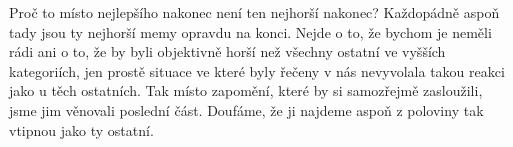 Proč to místo nejlepšího nakonec není ten nejhorší nakonec? Každopádně aspoň
tady jsou ty nejhorší memy opravdu na konci. Nejde o to, že bychom je neměli
rádi ani o to, že by byli objektivně horší než všechny ostatní ve vyšších
kategoriích, jen prostě situace ve které byly řečeny v nás nevyvolala takou
reakci jako u těch ostatních. Tak místo zapomění, které by si samozřejmě
zasloužili, jsme jim věnovali poslední část. Doufáme, že ji najdeme aspoň z
poloviny tak vtipnou jako ty ostatní.
